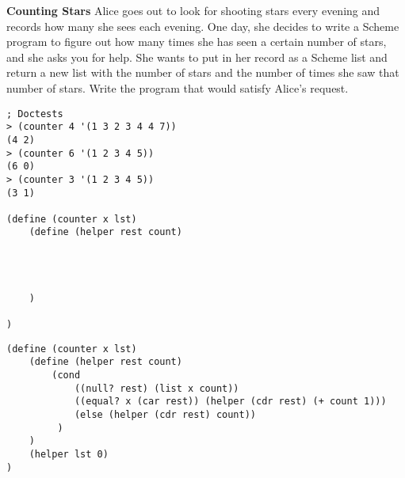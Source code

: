 \question \textbf{Counting Stars}
Alice goes out to look for shooting stars every evening and records how many she sees each evening. One day, she decides to write a Scheme program to figure out how many times she has seen a certain number of stars, and she asks you for help. She wants to put in her record as a Scheme list and return a new list with the number of stars and the number of times she saw that number of stars. Write the program that would satisfy Alice’s request.

\begin{lstlisting}
; Doctests
> (counter 4 '(1 3 2 3 4 4 7))
(4 2)
> (counter 6 '(1 2 3 4 5))
(6 0)
> (counter 3 '(1 2 3 4 5))
(3 1)

(define (counter x lst)
    (define (helper rest count)




    )
    
)
\end{lstlisting}

\begin{solution}
\begin{lstlisting}
(define (counter x lst)
    (define (helper rest count)
        (cond
            ((null? rest) (list x count))
            ((equal? x (car rest)) (helper (cdr rest) (+ count 1)))
            (else (helper (cdr rest) count))
         )
    )
    (helper lst 0)
)
\end{lstlisting}
\end{solution}
